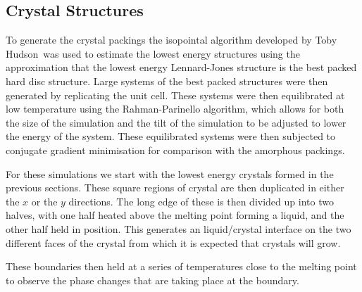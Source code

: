 \subsection{Crystal Structures}

To generate the crystal packings the isopointal algorithm developed by Toby Hudson~\tocite was used to estimate the lowest energy structures using the approximation that the lowest energy Lennard-Jones structure is the best packed hard disc structure. Large systems of the best packed structures were then generated by replicating the unit cell. These systems were then equilibrated at low temperature using the Rahman-Parinello algorithm, which allows for both the size of the simulation and the tilt of the simulation to be adjusted to lower the energy of the system. These equilibrated systems were then subjected to conjugate gradient minimisation for comparison with the amorphous packings.

For these simulations we start with the lowest energy crystals formed in the previous sections. These square regions of crystal are then duplicated in either the $x$ or the $y$ directions. The long edge of these is then divided up into two halves, with one half heated above the melting point forming a liquid, and the other half held in position. This generates an liquid/crystal interface on the two different faces of the crystal from which it is expected that crystals will grow.

These boundaries then held at a series of temperatures close to the melting point to observe the phase changes that are taking place at the boundary.

